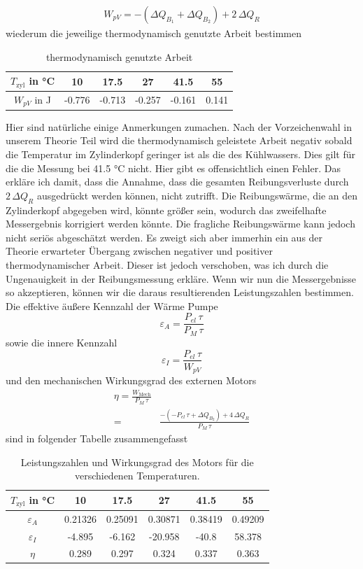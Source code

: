 \documentclass[a4paper, 12pt,]{scrartcl}
\begin{document}
\begin{align*}W_{pV}=-(\Delta{Q_{B_1}}+\Delta{Q_{B_2}})+2\,\Delta{Q_R}\end{align*}
wiederum die jeweilige thermodynamisch genutzte Arbeit bestimmen
\begin{table}[H]\centering\begin{tabular}{c|ccccc}
$T_\text{zyl}$ in °C&10&17.5&27&41.5&55\\\hline
$W_{pV}$ in J&-0.776&-0.713&-0.257&-0.161&0.141\end{tabular}
\caption{thermodynamisch genutzte Arbeit}\end{table}
Hier sind natürliche einige Anmerkungen zumachen. Nach der Vorzeichenwahl in unserem Theorie Teil wird die thermodynamisch geleistete Arbeit negativ sobald die Temperatur im Zylinderkopf geringer ist als die des Kühlwassers. Dies gilt für die die Messung bei 41.5 °C nicht. Hier gibt es offensichtlich einen Fehler. Das erkläre ich damit, dass die Annahme, dass die gesamten Reibungsverluste durch $2\,\Delta{Q}_R$ ausgedrückt werden können, nicht zutrifft. \newline
Die Reibungswärme, die an den Zylinderkopf abgegeben wird, könnte größer sein, wodurch das zweifelhafte Messergebnis korrigiert werden könnte. Die fragliche Reibungswärme kann jedoch nicht seriös abgeschätzt werden. Es zweigt sich aber immerhin ein aus der Theorie erwarteter Übergang zwischen negativer und positiver thermodynamischer Arbeit. Dieser ist jedoch verschoben, was ich durch die Ungenauigkeit in der Reibungsmessung erkläre. Wenn wir nun die Messergebnisse so akzeptieren, können wir die daraus resultierenden Leistungszahlen bestimmen.\newline\newline
Die effektive äußere Kennzahl der Wärme Pumpe
\begin{equation*}\varepsilon_{A}=\frac{P_{el}\,\tau}{P_M\,\tau}\end{equation*}
sowie die innere Kennzahl
\begin{equation*}\varepsilon_{I}=\frac{P_{el}\,\tau}{W_{pV}}\end{equation*}
und den mechanischen Wirkungsgrad des externen Motors
\begin{align*}\eta=\frac{W_\text{Mech}}{P_M\,\tau}\\
=&\frac{-(-P_{el}\,\tau+\Delta{Q_{B_2}})+4\,\Delta{Q_R}}{P_M\,\tau}\end{align*}
sind in folgender Tabelle zusammengefasst
\begin{table}[H]\centering\begin{tabular}{c|ccccc}
$T_\text{zyl}$ in °C&10&17.5&27&41.5&55\\\hline
$\varepsilon_A$&0.21326	&0.25091	&0.30871	&0.38419	&0.49209\\
$\varepsilon_I$&-4.895&-6.162&-20.958&-40.8&58.378\\
$\eta$&0.289&0.297&0.324&0.337&0.363\end{tabular}
\caption{Leistungszahlen und Wirkungsgrad des Motors für die verschiedenen Temperaturen.}\end{table}
\end{document}

